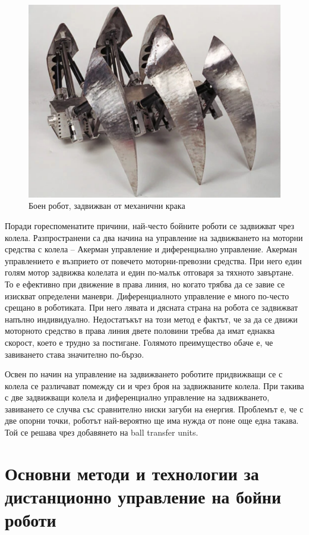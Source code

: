 \begin{figure}[H]
    \centering
    \includegraphics[width=0.6\linewidth]{images/using-legs.jpg}

    \caption{Боен робот, задвижван от механични крака}
    \label{fig:using-legs} 
\end{figure}

Поради гореспоменатите причини, най-често бойните роботи се задвижват чрез колела. Разпространени са два начина на управление на задвижването на моторни средства с колела – Акерман управление и диференциално управление. Акерман управлението е възприето от повечето моторни-превозни средства. При него един голям мотор задвижва колелата и един по-малък отговаря за тяхното завъртане. То е ефективно при движение в права линия, но когато трябва да се завие се изискват определени маневри. Диференциалното управление е много по-често срещано в роботиката. При него лявата и дясната страна на робота се задвижват напълно индивидуално. Недостатъкът на този метод е фактът, че за да се движи моторното средство в права линия двете половини требва да имат еднаква скорост, което е трудно за постигане. Голямото преимущество обаче е, че завиването става значително по-бързо.

Освен по начин на управление на задвижването роботите придвижващи се с колела се различават помежду си и чрез броя на задвижваните колела. При такива с две задвижващи колела и диференциално управление на задвижването, завиването се случва със сравнително ниски загуби на енергия. Проблемът е, че с две опорни точки, роботът най-вероятно ще има нужда от поне още една такава. Той се решава чрез добавянето на ball transfer units.



\section{Основни методи и технологии за дистанционно управление на бойни роботи}

